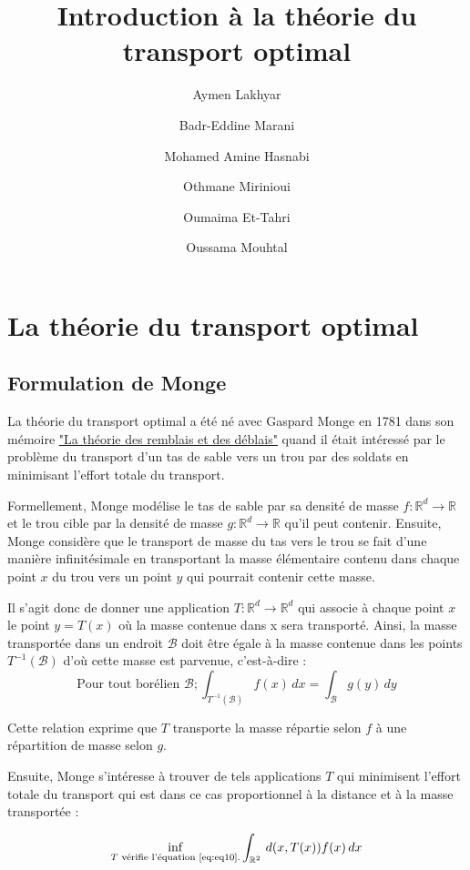 \documentclass[
    8.2pt,
    a4paper,
    logo,
    twocolumn
]{template}
\title{Introduction à la théorie du transport optimal}
\author[*]{Aymen Lakhyar}
\author[*]{Badr-Eddine Marani}
\author[*]{Mohamed Amine Hasnabi}
\author[*]{Othmane Mirinioui}
\author[*]{Oumaima Et-Tahri}
\author[*]{Oussama Mouhtal}
\affil[*]{Ecole Centrale Casablanca}
\begin{document}
    \maketitle
    \section{La théorie du transport optimal}
    \subsection{Formulation de Monge}\label{sec:introduction}
    La théorie du transport optimal a été né avec Gaspard Monge en 1781 dans son mémoire \href{http://images.math.cnrs.fr/Gaspard-Monge,1094.html}{"La théorie des remblais et des déblais"} quand il était intéressé par le problème du transport d’un tas de sable vers un trou par des soldats en minimisant l’effort totale du transport.

    Formellement, Monge modélise le tas de sable par sa densité de masse $f : \mathbb{R}^d \rightarrow \mathbb{R}$ et le trou cible par la densité de masse $g : \mathbb{R}^d \rightarrow \mathbb{R}$ qu’il peut contenir. Ensuite, Monge considère que le transport de masse du tas vers le trou se fait d’une manière infinitésimale en transportant la masse élémentaire contenu dans chaque point $x$ du trou vers un point $y$ qui pourrait contenir cette masse.

    Il s’agit donc de donner une application $T : \mathbb{R}^d \rightarrow \mathbb{R}^d$ qui associe à chaque point $x$ le point $y=T(x)$ où la masse contenue dans x sera transporté. Ainsi, la masse transportée dans un endroit $\mathcal{B}$ doit être égale à la masse contenue dans les points $T^{-1}(\mathcal{B})$ d’où cette masse est parvenue, c’est-à-dire :
    \begin{equation}\label{eq:eq10}
        \text{Pour tout borélien }\mathcal{B}; \int_{T^{-1}(\mathcal{B})} f(x) \,dx = \int_{\mathcal{B}} g(y) \,dy
    \end{equation}

    Cette relation exprime que $T$ transporte la masse répartie selon $f$ à une répartition de masse selon $g$.

    Ensuite, Monge s’intéresse à trouver de tels applications $T$ qui minimisent l’effort totale du transport qui est dans ce cas proportionnel à la distance et à la masse transportée :

    \[
        \inf_{\text{$T$ vérifie l'équation \ref{eq:eq10}.}} \int_{\mathbb{R}^2} \,d(x,T(x)) f(x) \,dx
    \]
\end{document}
